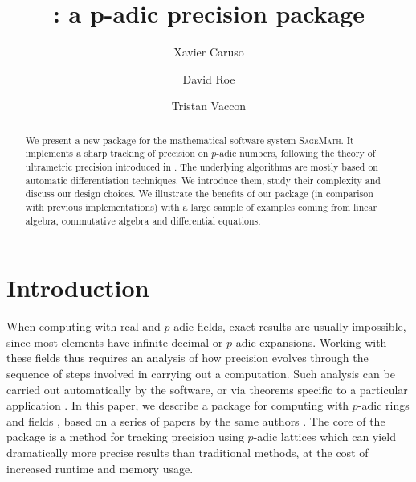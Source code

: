\documentclass[sigconf]{acmart}
\newcommand{\sage}{\textsc{SageMath}\xspace}
\newcommand{\ZpL}{\text{\color{output} \rm \tt ZpL}\xspace}
\theoremstyle{definition}
\begin{document}
\title{\texorpdfstring{\ZpL}{ZpL}: a p-adic precision package}

\author{Xavier Caruso}
\author{David Roe}
\author{Tristan Vaccon}



\begin{abstract}
We present a new package \ZpL for the mathematical software system \sage. It 
implements a sharp tracking of precision on $p$-adic numbers, following 
the theory of ultrametric precision introduced in \cite{caruso-roe-vaccon:14a}. The 
underlying algorithms are mostly based on automatic differentiation 
techniques. We introduce them, study their complexity and discuss our 
design choices.
We illustrate the benefits of our package (in comparison with previous 
implementations) with a large sample of examples coming from linear 
algebra, commutative algebra and differential equations.
\end{abstract}

\maketitle

\section{Introduction}

When computing with real and $p$-adic fields, exact results are usually impossible,
since most elements have infinite decimal or $p$-adic expansions.
Working with these fields thus requires an analysis of how precision evolves
through the sequence of steps involved in carrying out a computation.
Such analysis can be carried out automatically by the software, or via theorems specific
to a particular application \cite{kedlaya:01a, lauder:04a}.
In this paper, we describe a package for computing with $p$-adic rings and fields \cite{trac:23505},
based on a series of papers by the same authors
\cite{caruso-roe-vaccon:14a,caruso-roe-vaccon:15,caruso-roe-vaccon:16,caruso-roe-vaccon:17}.
The core of the package is a method for tracking precision using $p$-adic lattices which
can yield dramatically more precise results than traditional methods, at the cost of increased runtime and memory usage.
\end{document}
